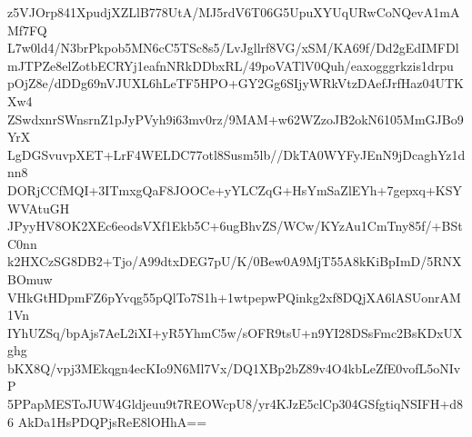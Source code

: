 z5VJOrp841XpudjXZLlB778UtA/MJ5rdV6T06G5UpuXYUqURwCoNQevA1mAMf7FQ
L7w0ld4/N3brPkpob5MN6cC5TSc8s5/LvJgllrf8VG/xSM/KA69f/Dd2gEdIMFDl
mJTPZe8elZotbECRYj1eafnNRkDDbxRL/49poVATlV0Quh/eaxogggrkzis1drpu
pOjZ8e/dDDg69nVJUXL6hLeTF5HPO+GY2Gg6SIjyWRkVtzDAefJrfHaz04UTKXw4
ZSwdxnrSWnsrnZ1pJyPVyh9i63mv0rz/9MAM+w62WZzoJB2okN6105MmGJBo9YrX
LgDGSvuvpXET+LrF4WELDC77otl8Susm5lb//DkTA0WYFyJEnN9jDcaghYz1dnn8
DORjCCfMQI+3ITmxgQaF8JOOCe+yYLCZqG+HsYmSaZlEYh+7gepxq+KSYWVAtuGH
JPyyHV8OK2XEc6eodsVXf1Ekb5C+6ugBhvZS/WCw/KYzAu1CmTny85f/+BStC0nn
k2HXCzSG8DB2+Tjo/A99dtxDEG7pU/K/0Bew0A9MjT55A8kKiBpImD/5RNXBOmuw
VHkGtHDpmFZ6pYvqg55pQlTo7S1h+1wtpepwPQinkg2xf8DQjXA6lASUonrAM1Vn
IYhUZSq/bpAjs7AeL2iXI+yR5YhmC5w/sOFR9tsU+n9YI28DSsFmc2BsKDxUXghg
bKX8Q/vpj3MEkqgn4ecKIo9N6Ml7Vx/DQ1XBp2bZ89v4O4kbLeZfE0vofL5oNIvP
5PPapMESToJUW4Gldjeuu9t7REOWcpU8/yr4KJzE5clCp304GSfgtiqNSIFH+d86
AkDa1HsPDQPjsReE8lOHhA==
